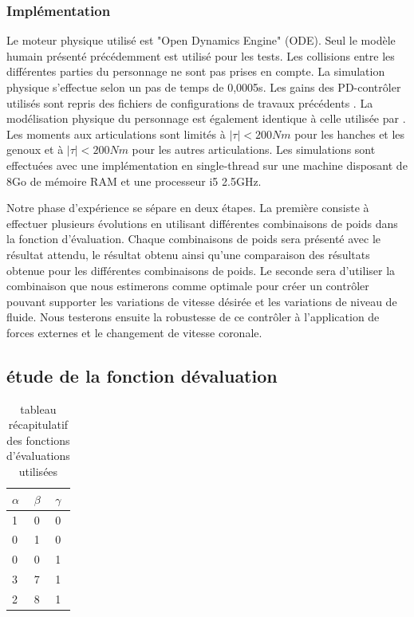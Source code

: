 \documentclass{llncs}
\begin{document}
\subsubsection{Implémentation}
Le moteur physique utilisé est "Open Dynamics Engine" (ODE). Seul le modèle humain présenté précédemment est utilisé pour les tests. Les collisions entre les différentes parties du personnage ne sont pas prises en compte. La simulation physique s'effectue selon un pas de temps de 0,0005s. Les gains des PD-contrôler utilisés sont repris des fichiers de configurations de travaux précédents \cite{coros2009robust}. La modélisation physique du personnage est également identique à celle utilisée par \cite{coros2009robust}. Les moments aux articulations sont limités à $|\tau|<200Nm$ pour les hanches et les genoux et à $|\tau|<200Nm$ pour les autres articulations.
Les simulations sont effectuées avec une implémentation en single-thread sur une machine disposant de 8Go de mémoire RAM et une processeur i5 2.5GHz.

Notre phase d'expérience se sépare en deux étapes. La première consiste à effectuer plusieurs évolutions en utilisant différentes combinaisons de poids dans la fonction d'évaluation. Chaque combinaisons de poids sera présenté avec le résultat attendu, le résultat obtenu ainsi qu'une comparaison des résultats obtenue pour les différentes combinaisons de poids. Le seconde sera d'utiliser la combinaison que nous estimerons comme optimale pour créer un contrôler pouvant supporter les variations de vitesse désirée et les variations de niveau de fluide. Nous testerons ensuite la robustesse de ce contrôler à l'application de forces externes et le changement de vitesse coronale.

\subsection{étude de la fonction dévaluation}

\begin{table}[h]

\centering
\begin{tabular}{lll}
\hline
$\alpha$ & $\beta$ & $\gamma$ \\ \hline
1      & 0     & 0      \\
0      & 1     & 0      \\
0      & 0     & 1      \\ 
3      & 7     & 1      \\
2      & 8     & 1     
\end{tabular}
\caption{tableau récapitulatif des fonctions d'évaluations utilisées}
\label{fig:eval_func_table}
\end{table}
\end{document}
